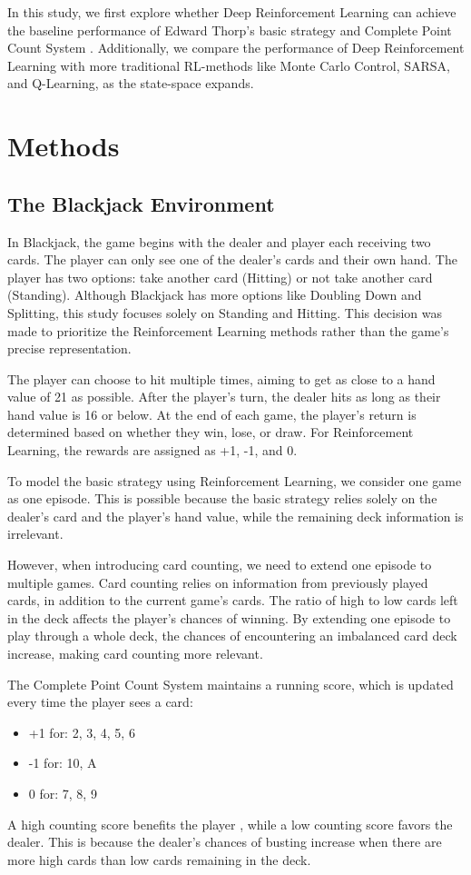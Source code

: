 \documentclass[conference]{IEEEtran}
\begin{document}
In this study, we first explore whether Deep Reinforcement Learning can achieve the baseline performance of Edward Thorp's basic strategy and Complete Point Count System \cite{b1}. Additionally, we compare the performance of Deep Reinforcement Learning with more traditional RL-methods like Monte Carlo Control, SARSA, and Q-Learning, as the state-space expands.


\section{Methods}

\subsection{The Blackjack Environment}
In Blackjack, the game begins with the dealer and player each receiving two cards. The player can only see one of the dealer's cards and their own hand. The player has two options: take another card (Hitting) or not take another card (Standing). Although Blackjack has more options like Doubling Down and Splitting, this study focuses solely on Standing and Hitting. This decision was made to prioritize the Reinforcement Learning methods rather than the game's precise representation.

The player can choose to hit multiple times, aiming to get as close to a hand value of 21 as possible. After the player's turn, the dealer hits as long as their hand value is 16 or below. At the end of each game, the player's return is determined based on whether they win, lose, or draw. For Reinforcement Learning, the rewards are assigned as +1, -1, and 0.

To model the basic strategy using Reinforcement Learning, we consider one game as one episode. This is possible because the basic strategy relies solely on the dealer's card and the player's hand value, while the remaining deck information is irrelevant.

However, when introducing card counting, we need to extend one episode to multiple games. Card counting relies on information from previously played cards, in addition to the current game's cards. The ratio of high to low cards left in the deck affects the player's chances of winning. By extending one episode to play through a whole deck, the chances of encountering an imbalanced card deck increase, making card counting more relevant.

The Complete Point Count System \cite{b1} maintains a running score, which is updated every time the player sees a card:
\begin{itemize}
	\item +1 for: 2, 3, 4, 5, 6
	\item -1 for: 10, A
	\item 0 for: 7, 8, 9 
\end{itemize}
A high counting score benefits the player \cite{b1}, while a low counting score favors the dealer. This is because the dealer's chances of busting increase when there are more high cards than low cards remaining in the deck.
\end{document}
